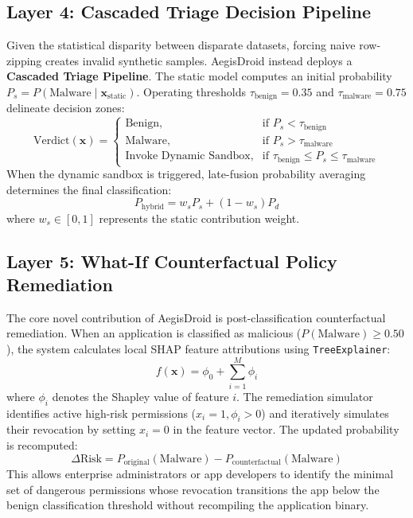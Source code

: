 \documentclass[10pt,journal,compsoc]{IEEEtran}
\begin{document}
\subsection{Layer 4: Cascaded Triage Decision Pipeline}
Given the statistical disparity between disparate datasets, forcing naive row-zipping creates invalid synthetic samples. AegisDroid instead deploys a \textbf{Cascaded Triage Pipeline}. The static model computes an initial probability $P_s = P(\text{Malware} \mid \mathbf{x}_{\text{static}})$. Operating thresholds $\tau_{\text{benign}} = 0.35$ and $\tau_{\text{malware}} = 0.75$ delineate decision zones:
\begin{equation}
\text{Verdict}(\mathbf{x}) = 
\begin{cases}
\text{Benign}, & \text{if } P_s < \tau_{\text{benign}} \\
\text{Malware}, & \text{if } P_s > \tau_{\text{malware}} \\
\text{Invoke Dynamic Sandbox}, & \text{if } \tau_{\text{benign}} \le P_s \le \tau_{\text{malware}}
\end{cases}
\end{equation}
When the dynamic sandbox is triggered, late-fusion probability averaging determines the final classification:
\begin{equation}
P_{\text{hybrid}} = w_s P_s + (1 - w_s) P_d
\end{equation}
where $w_s \in [0, 1]$ represents the static contribution weight.

\subsection{Layer 5: What-If Counterfactual Policy Remediation}
The core novel contribution of AegisDroid is post-classification counterfactual remediation. When an application is classified as malicious ($P(\text{Malware}) \ge 0.50$), the system calculates local SHAP feature attributions using \texttt{TreeExplainer}:
\begin{equation}
f(\mathbf{x}) = \phi_0 + \sum_{i=1}^{M} \phi_i
\end{equation}
where $\phi_i$ denotes the Shapley value of feature $i$.
The remediation simulator identifies active high-risk permissions ($x_i = 1, \phi_i > 0$) and iteratively simulates their revocation by setting $x_i = 0$ in the feature vector. The updated probability is recomputed:
\begin{equation}
\Delta \text{Risk} = P_{\text{original}}(\text{Malware}) - P_{\text{counterfactual}}(\text{Malware})
\end{equation}
This allows enterprise administrators or app developers to identify the minimal set of dangerous permissions whose revocation transitions the app below the benign classification threshold without recompiling the application binary.
\end{document}
